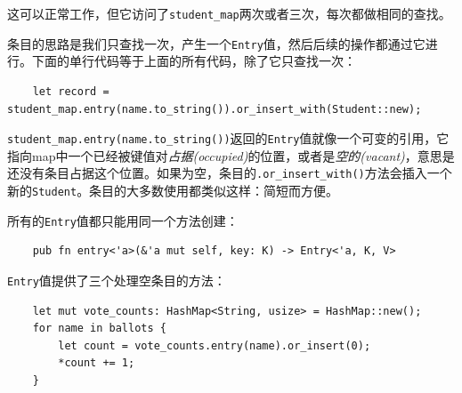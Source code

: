 这可以正常工作，但它访问了\texttt{student\_map}两次或者三次，每次都做相同的查找。

条目的思路是我们只查找一次，产生一个\texttt{Entry}值，然后后续的操作都通过它进行。下面的单行代码等于上面的所有代码，除了它只查找一次：
\begin{verbatim}
    let record = student_map.entry(name.to_string()).or_insert_with(Student::new);
\end{verbatim}

\texttt{student\_map.entry(name.to\_string())}返回的\texttt{Entry}值就像一个可变的引用，它指向map中一个已经被键值对\emph{占据(occupied)}的位置，或者是\emph{空的(vacant)}，意思是还没有条目占据这个位置。如果为空，条目的\texttt{.or\_insert\_with()}方法会插入一个新的\texttt{Student}。条目的大多数使用都类似这样：简短而方便。

所有的\texttt{Entry}值都只能用同一个方法创建：
\begin{verbatim}
    pub fn entry<'a>(&'a mut self, key: K) -> Entry<'a, K, V>
\end{verbatim}

\texttt{Entry}值提供了三个处理空条目的方法：

\begin{verbatim}
    let mut vote_counts: HashMap<String, usize> = HashMap::new();
    for name in ballots {
        let count = vote_counts.entry(name).or_insert(0);
        *count += 1;
    }
\end{verbatim}


